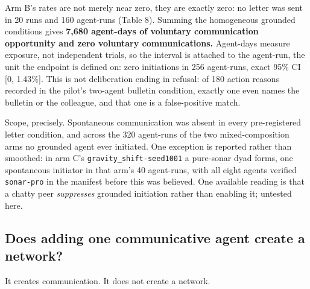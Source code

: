 \documentclass[pdflatex,sn-basic]{sn-jnl}
\begin{document}
Arm B's rates are not merely near zero, they are exactly zero: no letter was sent in 20 runs
and 160 agent-runs (Table 8). Summing the homogeneous grounded conditions gives \textbf{7,680 agent-days of
voluntary communication opportunity and zero voluntary communications.} Agent-days measure exposure, not independent trials, so the interval is attached to the
agent-run, the unit the endpoint is defined on:
zero initiations in 256 agent-runs, exact 95\% CI {[}0, 1.43\%{]}. This is not deliberation ending
in refusal: of 180 action reasons recorded in the pilot's two-agent bulletin condition, exactly one even names the bulletin or the colleague, and that one is a false-positive
match.

Scope, precisely. Spontaneous communication was absent in every pre-registered letter
condition, and across the 320 agent-runs of the two mixed-composition arms no grounded
agent ever initiated. One exception is reported rather than smoothed: in arm C's
\texttt{gravity\_shift-seed1001} a pure-sonar dyad forms, one spontaneous initiator in that arm's
40 agent-runs, with all eight agents verified \texttt{sonar-pro} in the manifest before this was
believed. One available reading is that a chatty peer \emph{suppresses} grounded initiation
rather than enabling it; untested here.

\hypertarget{does-adding-one-communicative-agent-create-a-network}{%
\subsection{Does adding one communicative agent create a network?}\label{does-adding-one-communicative-agent-create-a-network}}

It creates communication. It does not create a network.
\end{document}
